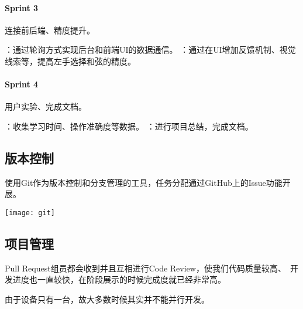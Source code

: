             \paragraph{Sprint 3} 连接前后端、精度提升。
            \begin{enumerate}
                ：通过轮询方式实现后台和前端UI的数据通信。
                ：通过在UI增加反馈机制、视觉线索等，提高左手选择和弦的精度。
            \end{enumerate}

            \paragraph{Sprint 4} 用户实验、完成文档。
            \begin{enumerate}
                ：收集学习时间、操作准确度等数据。
                ：进行项目总结，完成文档。
            \end{enumerate}

        \subsection{版本控制}
        使用Git作为版本控制和分支管理的工具，任务分配通过GitHub上的Issue功能开展。

        \texttt{[image: git]}

        \subsection{项目管理}
        Pull Request组员都会收到并且互相进行Code Review，使我们代码质量较高、\
        开发进度也一直较快，在阶段展示的时候完成度就已经非常高。

        由于设备只有一台，故大多数时候其实并不能并行开发。
